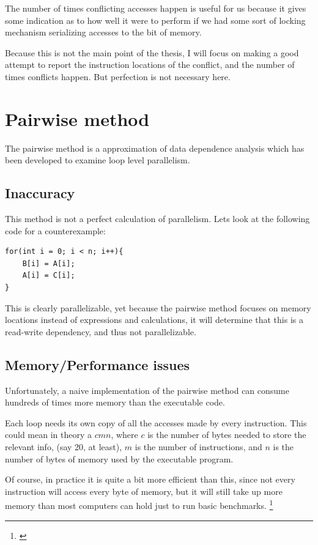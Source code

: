 \documentclass[12pt,twoside]{reedthesis}
\begin{document}
		The number of times conflicting accesses happen is useful for us because it gives some indication as to how well it were to perform if we had some sort of locking mechanism serializing accesses to the bit of memory. 
		
		Because this is not the main point of the thesis, I will focus on making a good attempt to report the instruction locations of the conflict, and the number of times conflicts happen. But perfection is not necessary here.
	\section{Pairwise method}
		The pairwise method is a approximation of data dependence analysis which has been developed to examine loop level parallelism. 
		
		
		\subsection{Inaccuracy}
		
		This method is not a perfect calculation of parallelism. Lets look at the following code for a counterexample:
		
\begin{lstlisting}
for(int i = 0; i < n; i++){
	B[i] = A[i];
	A[i] = C[i];
}
\end{lstlisting}
		
		This is clearly parallelizable, yet because the pairwise method focuses on memory locations instead of expressions and calculations, it will determine that this is a read-write dependency, and thus not parallelizable. 
		
		
	
		\subsection{Memory/Performance issues}
		
		Unfortunately, a naive implementation of the pairwise method can consume hundreds of times more memory than the executable code. 
		
		Each loop needs its own copy of all the accesses made by every instruction. This could mean in theory a $cmn$, where $c$ is the number of bytes needed to store the relevant info, (say 20, at least), $m$ is the number of instructions, and $n$ is the number of bytes of memory used by the executable program. 
		
		Of course, in practice it is quite a bit more efficient than this, since not every instruction will access every byte of memory, but it will still take up more memory than most computers can hold just to run basic benchmarks. \footnote{\cite{Kim:2010}}
		
\end{document}
